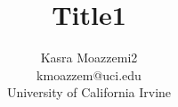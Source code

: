 \documentclass[journal]{IEEEtran}
\begin{document}
%
\title{Title1}
%
%
\author{Kasra Moazzemi2		\\kmoazzem@uci.edu\\University of California Irvine}



% 
%



\maketitle
\end{document}
